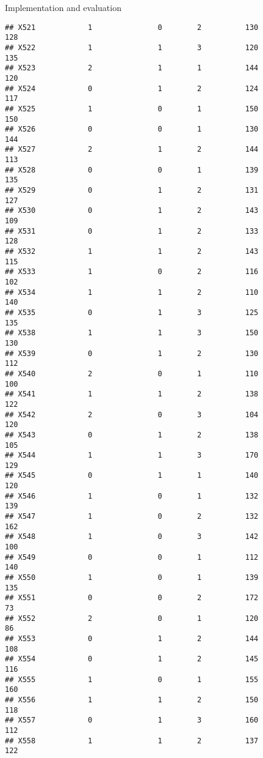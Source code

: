 \documentclass[
  ignorenonframetext,
]{beamer}
\begin{document}
\begin{frame}[fragile]{Implementation and evaluation}
\begin{verbatim}
## X521            1               0        2          130            128
## X522            1               1        3          120            135
## X523            2               1        1          144            120
## X524            0               1        2          124            117
## X525            1               0        1          150            150
## X526            0               0        1          130            144
## X527            2               1        2          144            113
## X528            0               0        1          139            135
## X529            0               1        2          131            127
## X530            0               1        2          143            109
## X531            0               1        2          133            128
## X532            1               1        2          143            115
## X533            1               0        2          116            102
## X534            1               1        2          110            140
## X535            0               1        3          125            135
## X538            1               1        3          150            130
## X539            0               1        2          130            112
## X540            2               0        1          110            100
## X541            1               1        2          138            122
## X542            2               0        3          104            120
## X543            0               1        2          138            105
## X544            1               1        3          170            129
## X545            0               1        1          140            120
## X546            1               0        1          132            139
## X547            1               0        2          132            162
## X548            1               0        3          142            100
## X549            0               0        1          112            140
## X550            1               0        1          139            135
## X551            0               0        2          172             73
## X552            2               0        1          120             86
## X553            0               1        2          144            108
## X554            0               1        2          145            116
## X555            1               0        1          155            160
## X556            1               1        2          150            118
## X557            0               1        3          160            112
## X558            1               1        2          137            122

\end{verbatim}
\end{frame}
\end{document}
